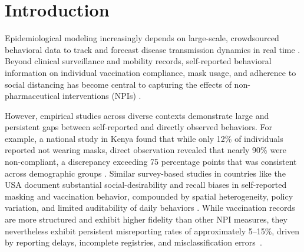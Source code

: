\documentclass[sigconf,review]{acmart}
\begin{document}


\maketitle


\section{Introduction}
Epidemiological modeling increasingly depends on large-scale, crowdsourced behavioral data to track and forecast disease transmission dynamics in real time \cite{banerjee2022,BergstromRS2002}. Beyond clinical surveillance and mobility records, self-reported behavioral information on individual vaccination compliance, mask usage, and adherence to social distancing has become central to capturing the effects of non-pharmaceutical interventions (NPIs) \cite{bff2025}. 

However, empirical studies across diverse contexts demonstrate large and persistent gaps between self-reported and directly observed behaviors. For example, a national study in Kenya found that while only 12\% of individuals reported not wearing masks, direct observation revealed that nearly 90\% were non-compliant, a discrepancy exceeding 75 percentage points that was consistent across demographic groups \cite{kenya2021}. Similar survey-based studies in countries like the USA document substantial social-desirability and recall biases in self-reported masking and vaccination behavior, compounded by spatial heterogeneity, policy variation, and limited auditability of daily behaviors \cite{spatiotemporal}. While vaccination records are more structured and exhibit higher fidelity than other NPI measures, they nevertheless exhibit persistent misreporting rates of approximately 5–15\%, driven by reporting delays, incomplete registries, and misclassification errors~\cite{HURLEY2026128101,DALEY20242740,IRVING20096546}.
\end{document}
